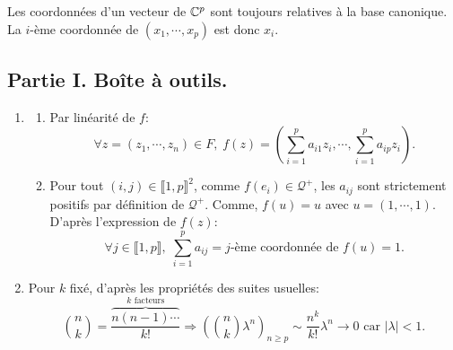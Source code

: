 Les coordonnées d'un vecteur de $\mathbb{C}^p$ sont toujours relatives à la base canonique. La $i$-ème coordonnée de $(x_1,\cdots,x_p)$ est donc $x_i$.
\subsection*{Partie I. Boîte à outils.}
\begin{enumerate}
  \item 
  \begin{enumerate}
    \item Par linéarité de $f$:
\[
  \forall z = (z_1, \cdots, z_n)\in F, \; f(z) = \left( \sum_{i=1}^p a_{i 1} z_i, \cdots, \sum_{i=1}^p a_{i p} z_i\right).
\]

    \item Pour tout $(i,j) \in \llbracket 1,p \rrbracket^2$, comme $f(e_i) \in \mathcal{Q}^+$, les $a_{ij}$ sont strictement positifs par définition de $\mathcal{Q}^+$.\newline
    Comme, $f(u) = u$ avec $u = (1, \cdots, 1)$. D'après l'expression de $f(z)$:
\[
  \forall j \in \llbracket 1,p \rrbracket, \; \sum_{i=1}^p a_{i j} = j\text{-ème coordonnée de }f(u) = 1.
\]
  \end{enumerate}

  \item Pour $k$ fixé, d'après les propriétés des suites usuelles:
\begin{displaymath}
\binom{n}{k} = \frac{\overset{k \text{ facteurs}}{\overbrace{n(n-1)\cdots }}}{k!}
\Rightarrow
\left(\binom{n}{k}\lambda^n\right) _{n\geq p} \sim
\frac{n^k}{k!}\lambda ^n \rightarrow 0 \text{ car } |\lambda|<1 .
\end{displaymath}


\end{enumerate}
